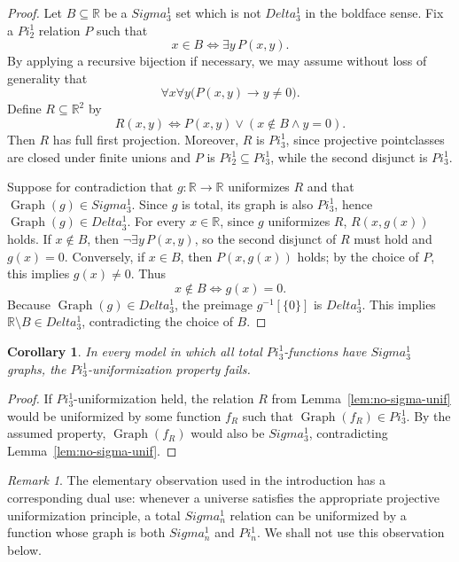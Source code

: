 \documentclass{article}
\newtheorem{corollary}[theorem]{Corollary}
\theoremstyle{remark}
\newtheorem{remark}[theorem]{Remark}
\theoremstyle{plain}
\newcommand{\Graph}{\operatorname{Graph}}
\newcommand{\Real}{\mathbb{R}}
\def\mathbf#1{#1}%
\def\Pi{Pi}%
\def\Sigma{Sigma}%
\def\Delta{Delta}%
\begin{document}
\begin{proof}
Let $B\subseteq\Real$ be a $\mathbf{\Sigma}^1_3$ set which is not $\mathbf{\Delta}^1_3$ in the boldface sense.
Fix a $\mathbf{\Pi}^1_2$ relation $P$ such that
\[
 x\in B\iff \exists y\,P(x,y).
\]
By applying a recursive bijection if necessary, we may assume without loss of generality that
\[
   \forall x\forall y\bigl(P(x,y)\rightarrow y\neq 0\bigr).
\]
Define $R\subseteq\Real^2$ by
\[
 R(x,y)\iff P(x,y)\vee (x\notin B\wedge y=0).
\]
Then $R$ has full first projection.
Moreover, $R$ is $\mathbf{\Pi}^1_3$, since projective pointclasses are closed under finite unions and $P$ is $\mathbf{\Pi}^1_2\subseteq\mathbf{\Pi}^1_3$, while the second disjunct is $\mathbf{\Pi}^1_3$.

Suppose for contradiction that $g\colon\Real\to\Real$ uniformizes $R$ and that $\Graph(g)\in\mathbf{\Sigma}^1_3$.
Since $g$ is total, its graph is also $\mathbf{\Pi}^1_3$, hence $\Graph(g)\in\mathbf{\Delta}^1_3$.
For every $x\in\Real$, since $g$ uniformizes $R$, $R(x,g(x))$ holds.
If $x\notin B$, then $\neg\exists y\,P(x,y)$, so the second disjunct of $R$ must hold and $g(x)=0$.
Conversely, if $x\in B$, then $P(x,g(x))$ holds; by the choice of $P$, this implies $g(x)\neq0$.
Thus
\[
 x\notin B\iff g(x)=0.
\]
Because $\Graph(g)\in\mathbf{\Delta}^1_3$, the preimage $g^{-1}[\{0\}]$ is $\mathbf{\Delta}^1_3$.
This implies $\Real\setminus B\in\mathbf{\Delta}^1_3$, contradicting the choice of $B$.
\end{proof}

\begin{corollary}\label{cor:unif-fails}
In every model in which all total $\mathbf{\Pi}^1_3$-functions have $\mathbf{\Sigma}^1_3$ graphs, the $\mathbf{\Pi}^1_3$-uniformization property fails.
\end{corollary}

\begin{proof}
If $\mathbf{\Pi}^1_3$-uniformization held, the relation $R$ from Lemma~\ref{lem:no-sigma-unif} would be uniformized by some function $f_R$ such that $\Graph(f_R)\in\mathbf{\Pi}^1_3$.
By the assumed property, $\Graph(f_R)$ would also be $\mathbf{\Sigma}^1_3$, contradicting Lemma~\ref{lem:no-sigma-unif}.
\end{proof}

\begin{remark}
The elementary observation used in the introduction has a corresponding dual use: whenever a universe satisfies the appropriate projective uniformization principle, a total $\mathbf{\Sigma}^1_n$ relation can be uniformized by a function whose graph is both $\mathbf{\Sigma}^1_n$ and $\mathbf{\Pi}^1_n$.
We shall not use this observation below.
\end{remark}
\end{document}
